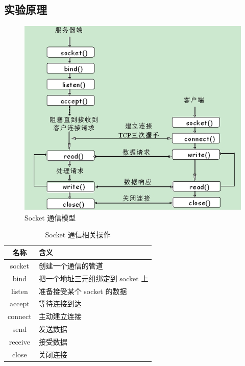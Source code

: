 \documentclass[14pt,a4paper,UTF8,twoside]{article}
\begin{document}
\subsection{实验原理}

\begin{multicols}{2}
    \begin{figure}[H]
        \centering
        \includegraphics[width=0.8\linewidth]{lab7/theory.png}
        \caption{Socket 通信模型}
        \label{fig:socket}
    \end{figure}

    \columnbreak

    \begin{table}[H]
        \centering
        \setlength{\tabcolsep}{10pt} %
        \renewcommand{\arraystretch}{1.3} %
        \begin{tabular}{|c|p{6cm}|}
            \hline
            \textbf{名称} & \textbf{含义} \\
            \hline
            socket  & 创建一个通信的管道 \\
            \hline
            bind    & 把一个地址三元组绑定到 socket 上 \\
            \hline
            listen  & 准备接受某个 socket 的数据 \\
            \hline
            accept  & 等待连接到达 \\
            \hline
            connect & 主动建立连接 \\
            \hline
            send    & 发送数据 \\
            \hline
            receive & 接受数据 \\
            \hline
            close   & 关闭连接 \\
            \hline
        \end{tabular}
        \caption{Socket 通信相关操作}
        \label{tab:socket}
    \end{table}
\end{multicols}
\end{document}
